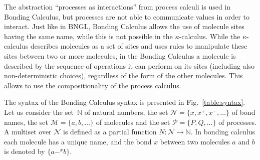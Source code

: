 \documentclass[runningheads]{llncs}
\newcommand{\N}{\mathbb{N}}
\newcommand{\mN}{\mathcal{N}}
\newcommand{\mM}{\mathcal{M}}
\newcommand{\mP}{\mathcal{P}}
\begin{document}
The abstraction ``processes as interactions'' from process calculi is used in Bonding Calculus, but processes are not able to communicate values in order to interact. Just like in BNGL, Bonding Calculus allows the use of molecule sites having the same name, while this is not possible in the $\kappa$-calculus. While the $\kappa$-calculus describes molecules as a set of sites and uses rules to manipulate these sites between two or more molecules, in the  Bonding Calculus a molecule is described by the sequence of operations it can perform on its sites (including also non-deterministic choices), regardless of the form of the other molecules. This allows to use the compositionality of the process calculus.

The syntax of the Bonding Calculus syntax is presented in Fig.~\ref{table:syntax}. 
Let us consider the set~$\mathbb{N}$ of natural numbers, the set 
$\mN=\{x,x^+,x^-,\dots\}$ of bond names, the set $\mM=\{a,b,\dots\}$ of 
molecules and the set $\mP=\{P,Q,\ldots\}$ of processes. A multiset over 
$\mN$ is defined as a partial function $N:\mN \rightarrow \N$. In bonding 
calculus each molecule has a unique name, and the bond $x$ between two 
molecules $a$ and $b$ is denoted by $\{a-^x b\}$.
\end{document}
